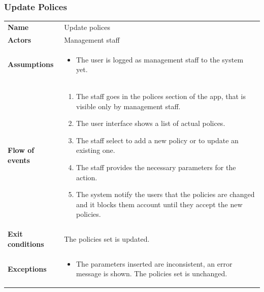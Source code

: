 \documentclass[english]{article}
\begin{document}
		\subsubsection{Update Polices}
		\begin{center}
		\begin{tabular}{l||p{10cm}}
		\textbf{Name} 
			& Update polices\\ [8px]
		\textbf{Actors} 
			& Management staff\\ [8px]
		\textbf{Assumptions} 
			& \begin{itemize}
				\item The user is logged as management staff to the system yet.
			\end{itemize}\\
		\textbf{Flow of events}
			& \begin{enumerate}
	 			\item The staff goes in the polices section of the app, that is visible only by management staff.
				\item The user interface shows a list of actual polices.
				\item The staff select to add a new policy or to update an existing one.
				\item The staff provides the necessary parameters for the action.
				\item The system notify the users that the policies are changed and it blocks them account until they accept the new policies.
			\end{enumerate}\\ 
		\textbf{Exit conditions}
			& The policies set is updated.\\ [8px]
		\textbf{Exceptions}
			& \begin{itemize}
				\item The parameters inserted are inconsistent, an error message is shown. The policies set is unchanged.
			\end{itemize}
		\end{tabular}
		\end{center}
		\vspace*{\fill}
		\noindent
\end{document}
